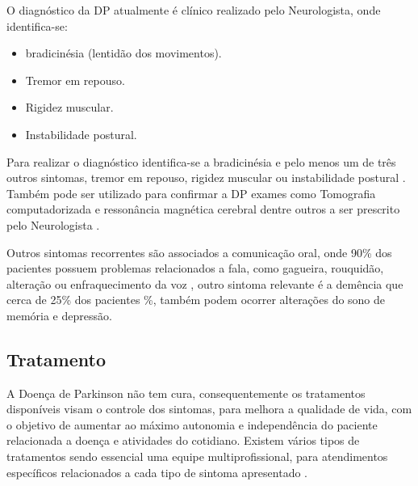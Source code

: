 O diagnóstico da DP atualmente é clínico realizado pelo Neurologista, onde identifica-se:
\begin{itemize}
	\item bradicinésia (lentidão dos movimentos).
	\item Tremor em repouso.
	\item Rigidez muscular.
	\item Instabilidade postural.
\end{itemize}

Para realizar o diagnóstico identifica-se a bradicinésia e pelo menos um de três outros sintomas, tremor em repouso, rigidez muscular ou instabilidade postural \cite{gago2014manual}. Também pode ser utilizado para confirmar a DP exames como Tomografia computadorizada e ressonância magnética cerebral dentre outros a ser prescrito pelo Neurologista \cite{gago2014manual}.

Outros sintomas recorrentes são associados a comunicação oral, onde 90\% dos pacientes possuem problemas relacionados a fala, como gagueira, rouquidão, alteração ou enfraquecimento da voz \cite{zarzur2010laryngeal}, outro sintoma relevante é a demência que cerca de 25\% dos pacientes \cite{pamplona1996demencia}\%, também podem ocorrer alterações do sono de memória e depressão\cite{barbosa2005parkinsons}.

\subsection{Tratamento}
A Doença de Parkinson não tem cura, consequentemente os tratamentos disponíveis visam o controle dos sintomas, para melhora a qualidade de vida, com o objetivo de aumentar ao máximo autonomia e independência do paciente relacionada a doença e atividades do cotidiano. Existem vários tipos de tratamentos sendo essencial uma equipe multiprofissional, para atendimentos específicos relacionados a cada tipo de sintoma apresentado \cite{saito2011doencca}.